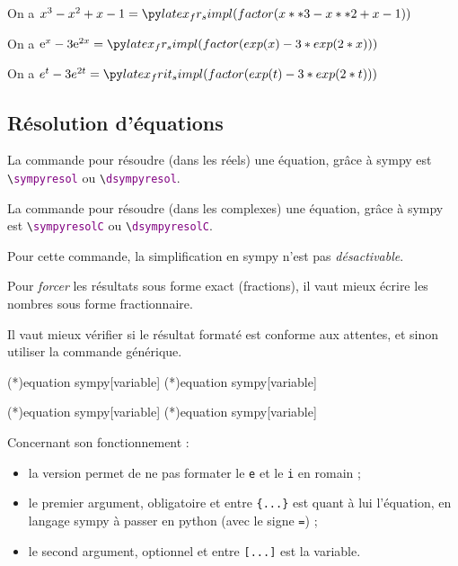 \documentclass[french,a4paper,11pt]{article}
\newcommand\Cle[1]{{\bfseries\sffamily\textlangle #1\textrangle}}
\begin{document}
\begin{bloctext}
On a $x^3-x^2+x-1 = \sympyfact{x**3-x**2+x-1}$

On a $\e^x-3\e^{2x} = \sympyfact{exp(x)-3*exp(2*x)}$   %

On a $e^t-3e^{2t} = \sympyfact*{exp(t)-3*exp(2*t)}$
\end{bloctext}

\subsection{Résolution d'équations}

\begin{cautionblock}
La commande pour résoudre (dans les réels) une équation, grâce à \textsf{sympy} est \texttt{\textbackslash \textcolor{purple}{sympyresol}} ou \texttt{\textbackslash \textcolor{purple}{dsympyresol}}.

La commande pour résoudre (dans les complexes) une équation, grâce à \textsf{sympy} est \texttt{\textbackslash \textcolor{purple}{sympyresolC}} ou \texttt{\textbackslash \textcolor{purple}{dsympyresolC}}.
\end{cautionblock}

\smallskip

\begin{importantblock}
Pour cette commande, la simplification en \textsf{sympy} n'est pas \textit{désactivable}.

\smallskip

Pour \textit{forcer} les résultats sous forme exact (fractions), il vaut mieux écrire les nombres sous forme fractionnaire.

\smallskip

Il vaut mieux vérifier si le résultat formaté est conforme aux attentes, et sinon utiliser la commande générique.
\end{importantblock}

\begin{bloctext}
\sympyresol(*){equation sympy}[variable]
\dsympyresol(*){equation sympy}[variable]

\sympyresolC(*){equation sympy}[variable]
\dsympyresolC(*){equation sympy}[variable]
\end{bloctext}

\begin{tipblock}
Concernant son fonctionnement :

\begin{itemize}
	\item la version \Cle{*} permet de ne pas formater le \texttt{e} et le \texttt{i} en \textsf{romain} ;
	\item le premier argument, obligatoire et entre \texttt{\{...\}} est quant à lui l'équation, en langage \textsf{sympy} à passer en \textsf{python} (avec le signe \texttt{=}) ;
	\item le second argument, optionnel et entre \texttt{[...]} est la variable.
\end{itemize}
\vspace*{-\baselineskip}\leavevmode
\end{tipblock}
\end{document}

